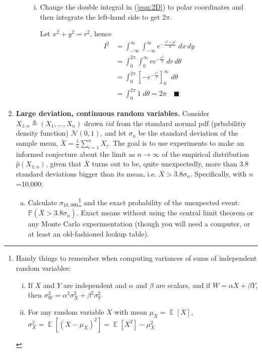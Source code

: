 \documentclass[12pt]{article}
\renewcommand{\hat}[1]{\widehat{#1}}
\renewcommand{\P}{\mathbb{P}}
\newcommand{\qed}{\quad \blacksquare}
\renewcommand{\bar}[1]{\overline{#1}}
\DeclareMathOperator{\Exp}{\mathbb{E}}
\begin{document}
\begin{enumerate}[1.]
\begin{enumerate}[(a)]
\begin{enumerate}[i.]
			            \item Change the double integral in (\ref{eqn:2D}) to polar coordinates and then integrate the left-hand side to get $2\pi$.

			                  \color{blue}
			                  Let $x^2 + y^2 = r^2$, hence
			                  \begin{align*}
				                  I^2 & = \int_{-\infty}^\infty  \int_{-\infty}^\infty e^{-\frac{x^2+y^2}{2}} \;dx\,dy \\
				                      & = \int_{0}^{2\pi} \int_{0}^{\infty} re^{-\frac{r^2}{2}} \;dr\,d\theta          \\
				                      & = \int_0^{2\pi} \left[-e^{-\frac{r^2}{2}}\right]_0^{\infty} \; d\theta         \\
				                      & = \int_0^{2\pi} 1 \; d\theta = 2\pi \qed
			                  \end{align*}
			                  \color{black}

		            \end{enumerate}

	      \end{enumerate}



	      \pagebreak

	\item {\bf Large deviation, continuous random variables.}
	      \label{prob:LD_continuous}
	      Consider $X_{1:n} \triangleq (X_1,\dotsc,X_n)$ drawn $iid$ from the standard normal pdf (prbabilitiy density function)
	      ${\mathcal N}(0,1)$, and let $\sigma_n$ be the standard deviation of the sample mean,
	      $\bar{X}=\frac{1}{n}\sum_{i=1}^n X_i$. The goal is to use experiments to make an informed conjecture about the
	      limit as $n\to\infty$ of the empirical distribution $\hat{p}(X_{1:n})$, given that $\bar{X}$ turns out to be, quite unexpectedly, more than 3.8 standard deviations bigger than its
	      mean, i.e. $\bar{X} > 3.8\sigma_n$. Specifically, with $n$=10,000:
	      \begin{enumerate}[(a)]
		      \item Calculate $\sigma_{10,000}$\footnote{
			            Handy things to remember when computing variances of sums of independent random variables:
			            \begin{enumerate}[(i)]
				            \item If $X$ and $Y$ are independent and $\alpha$ and $\beta$ are scalars, and if $W = \alpha X + \beta Y$, then $\sigma_W^2 = \alpha^2 \sigma_X^2 + \beta^2\sigma_Y^2$
				            \item For any random variable $X$ with mean $\mu_X = \Exp[X]$, $\sigma_X^2 = \Exp[(X-\mu_X)^2] = \Exp[X^2] - \mu_X^2$
			            \end{enumerate}
		            } and the exact probability of the unexpected event: $\P(\bar{X}>3.8\sigma_n)$. Exact means without using the central limit theorem or any Monte Carlo experimentation (though you will need a computer, or at least an old-fashioned lookup table).


\end{enumerate}
\end{enumerate}
\end{document}
